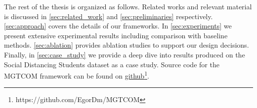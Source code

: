 The rest of the thesis is organized as follows. 
Related works and relevant material is discussed in \cref{sec:related_work} and \cref{sec:preliminaries} respectively.
\cref{sec:approach} covers the details of our frameworks.
In \cref{sec:experiments} we present extensive experimental results including comparison with baseline methods.
\cref{sec:ablation} provides ablation studies to support our design decisions.
Finally, in \cref{sec:case_study} we provide a deep dive into results produced on the Social Distancing Students dataset as a case study.
Source code for the MGTCOM framework can be found on \hyperlink{https://github.com/EgorDm/MGTCOM}{github}\footnote{https://github.com/EgorDm/MGTCOM}.